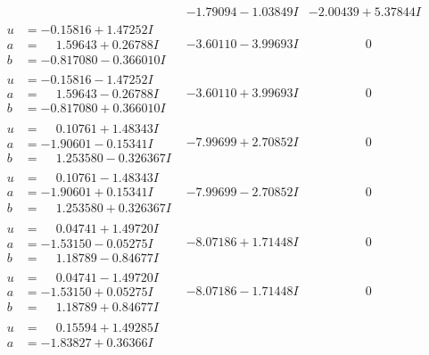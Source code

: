\documentclass[1p]{elsarticle_modified}
\theoremstyle{definition}
\begin{document}
$$\begin{array}{c|c|c}
 & -1.79094 - 1.03849 I & -2.00439 + 5.37844 I \\ \hline\begin{aligned}
u &= -0.15816 + 1.47252 I \\
a &= \phantom{-}1.59643 + 0.26788 I \\
b &= -0.817080 - 0.366010 I\end{aligned}
 & -3.60110 - 3.99693 I & \phantom{-0.000000 } 0 \\ \hline\begin{aligned}
u &= -0.15816 - 1.47252 I \\
a &= \phantom{-}1.59643 - 0.26788 I \\
b &= -0.817080 + 0.366010 I\end{aligned}
 & -3.60110 + 3.99693 I & \phantom{-0.000000 } 0 \\ \hline\begin{aligned}
u &= \phantom{-}0.10761 + 1.48343 I \\
a &= -1.90601 - 0.15341 I \\
b &= \phantom{-}1.253580 - 0.326367 I\end{aligned}
 & -7.99699 + 2.70852 I & \phantom{-0.000000 } 0 \\ \hline\begin{aligned}
u &= \phantom{-}0.10761 - 1.48343 I \\
a &= -1.90601 + 0.15341 I \\
b &= \phantom{-}1.253580 + 0.326367 I\end{aligned}
 & -7.99699 - 2.70852 I & \phantom{-0.000000 } 0 \\ \hline\begin{aligned}
u &= \phantom{-}0.04741 + 1.49720 I \\
a &= -1.53150 - 0.05275 I \\
b &= \phantom{-}1.18789 - 0.84677 I\end{aligned}
 & -8.07186 + 1.71448 I & \phantom{-0.000000 } 0 \\ \hline\begin{aligned}
u &= \phantom{-}0.04741 - 1.49720 I \\
a &= -1.53150 + 0.05275 I \\
b &= \phantom{-}1.18789 + 0.84677 I\end{aligned}
 & -8.07186 - 1.71448 I & \phantom{-0.000000 } 0 \\ \hline\begin{aligned}
u &= \phantom{-}0.15594 + 1.49285 I \\
a &= -1.83827 + 0.36366 I \\

\end{aligned}
\end{array}$$
\end{document}

